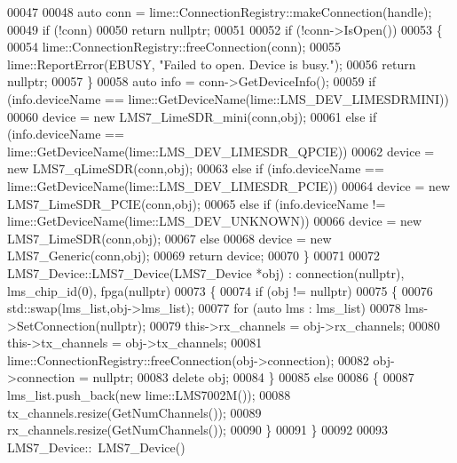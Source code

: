 \begin{DoxyCode}
00047 
00048     \textcolor{keyword}{auto} conn = lime::ConnectionRegistry::makeConnection(handle);
00049     \textcolor{keywordflow}{if} (!conn)
00050         \textcolor{keywordflow}{return} \textcolor{keyword}{nullptr};
00051 
00052     \textcolor{keywordflow}{if} (!conn->IsOpen())
00053     \{
00054         lime::ConnectionRegistry::freeConnection(conn);
00055         lime::ReportError(EBUSY, \textcolor{stringliteral}{"Failed to open. Device is busy."});
00056         \textcolor{keywordflow}{return} \textcolor{keyword}{nullptr};
00057     \}
00058     \textcolor{keyword}{auto} info = conn->GetDeviceInfo();
00059     \textcolor{keywordflow}{if} (info.deviceName ==  lime::GetDeviceName(lime::LMS_DEV_LIMESDRMINI))
00060         device = \textcolor{keyword}{new} LMS7_LimeSDR_mini(conn,obj);
00061     \textcolor{keywordflow}{else} \textcolor{keywordflow}{if} (info.deviceName == lime::GetDeviceName(lime::LMS_DEV_LIMESDR_QPCIE))
00062         device = \textcolor{keyword}{new} LMS7_qLimeSDR(conn,obj);
00063     \textcolor{keywordflow}{else} \textcolor{keywordflow}{if} (info.deviceName == lime::GetDeviceName(lime::LMS_DEV_LIMESDR_PCIE))
00064         device = \textcolor{keyword}{new} LMS7_LimeSDR_PCIE(conn,obj);
00065     \textcolor{keywordflow}{else} \textcolor{keywordflow}{if} (info.deviceName != lime::GetDeviceName(lime::LMS_DEV_UNKNOWN))
00066         device = \textcolor{keyword}{new} LMS7_LimeSDR(conn,obj);
00067     \textcolor{keywordflow}{else}
00068         device = \textcolor{keyword}{new} LMS7_Generic(conn,obj);
00069     \textcolor{keywordflow}{return} device;
00070 \}
00071 
00072 LMS7_Device::LMS7_Device(LMS7_Device *obj) : connection(nullptr), lms_chip_id(0),
      fpga(nullptr)
00073 \{
00074     \textcolor{keywordflow}{if} (obj != \textcolor{keyword}{nullptr})
00075     \{
00076         std::swap(lms_list,obj->lms_list);
00077         \textcolor{keywordflow}{for} (\textcolor{keyword}{auto} lms : lms_list)
00078             lms->SetConnection(\textcolor{keyword}{nullptr});
00079         this->rx_channels = obj->rx_channels;
00080         this->tx_channels = obj->tx_channels;
00081         lime::ConnectionRegistry::freeConnection(obj->connection);
00082         obj->connection = \textcolor{keyword}{nullptr};
00083         \textcolor{keyword}{delete} obj;
00084     \}
00085     \textcolor{keywordflow}{else}
00086     \{
00087         lms_list.push\_back(\textcolor{keyword}{new} lime::LMS7002M());
00088         tx_channels.resize(GetNumChannels());
00089         rx_channels.resize(GetNumChannels());
00090     \}
00091 \}
00092 
00093 LMS7_Device::~LMS7_Device()

\end{DoxyCode}
